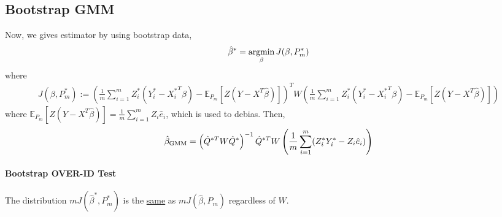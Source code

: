 \documentclass[11pt]{elegantbook}
\newcommand{\argmin}{\operatornamewithlimits{argmin}}
\begin{document}
\subsection{Bootstrap GMM}
Now, we gives estimator by using bootstrap data,
\begin{equation}
    \begin{aligned}
        \hat{\beta}^*=\argmin_\beta J(\beta,P_m^*)
    \end{aligned}
    \nonumber
\end{equation}
where
\begin{equation}
    \begin{aligned}
        J(\beta,P_m^*):=\left(\frac{1}{m}\sum_{i=1}^mZ_i^*(Y_i^*-{X_i^*}^T\beta)-\mathbb{E}_{P_m}[Z(Y-X^T\hat{\beta})]\right)^TW\left(\frac{1}{m}\sum_{i=1}^mZ_i^*(Y_i^*-{X_i^*}^T\beta)-\mathbb{E}_{P_m}[Z(Y-X^T\hat{\beta})]\right)
    \end{aligned}
    \nonumber
\end{equation}
where $\mathbb{E}_{P_m}[Z(Y-X^T\hat{\beta})]=\frac{1}{m}\sum_{i=1}^m Z_i\hat{e}_i$, which is used to debias. Then,
\begin{equation}
    \begin{aligned}
        \hat{\beta}_\textnormal{GMM}=\left(\hat{Q}^{*T}W\hat{Q}^*\right)^{-1}\hat{Q}^{*T}W\left(\frac{1}{m}\sum_{i=1}^m(Z_i^*Y_i^*-Z_i\hat{e}_i)\right)
    \end{aligned}
    \nonumber
\end{equation}
\paragraph*{Bootstrap OVER-ID Test}
The distribution $m J(\hat{\beta}^*,P_m^*)$ is the \underline{same} as $m J(\hat{\beta},P_m)$ regardless of $W$.
\end{document}
